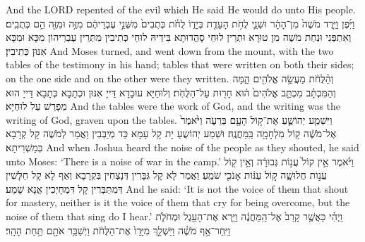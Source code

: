 {{And the LORD repented of the evil which He said He would do unto His people.}{}
{וַיִּ֜פֶן וַיֵּ֤רֶד מֹשֶׁה֙ מִן־הָהָ֔ר וּשְׁנֵ֛י לֻחֹ֥ת הָעֵדֻ֖ת בְּיָד֑וֹ לֻחֹ֗ת כְּתֻבִים֙ מִשְּׁנֵ֣י עֶבְרֵיהֶ֔ם מִזֶּ֥ה וּמִזֶּ֖ה הֵ֥ם כְּתֻבִֽים׃
}
{וְאִתְפְּנִי וּנְחַת מֹשֶׁה מִן טוּרָא וּתְרֵין לוּחֵי סָהֲדוּתָא בִּידֵיהּ לוּחֵי כְּתִיבִין מִתְּרֵין עֶבְרֵיהוֹן מִכָּא וּמִכָּא אִנּוּן כְּתִיבִין׃}
{And Moses turned, and went down from the mount, with the two tables of the testimony in his hand; tables that were written on both their sides; on the one side and on the other were they written.}{}
{וְהַ֨לֻּחֹ֔ת מַעֲשֵׂ֥ה אֱלֹהִ֖ים הֵ֑מָּה וְהַמִּכְתָּ֗ב מִכְתַּ֤ב אֱלֹהִים֙ ה֔וּא חָר֖וּת עַל־הַלֻּחֹֽת׃
}
{וְלוּחַיָּא עוּבָדָא דַּייָ אִנּוּן וּכְתָבָא כְּתָבָא דַּייָ הוּא מְפָרַשׁ עַל לוּחַיָּא׃}
{And the tables were the work of God, and the writing was the writing of God, graven upon the tables.}{}
{וַיִּשְׁמַ֧ע יְהוֹשֻׁ֛עַ אֶת־ק֥וֹל הָעָ֖ם בְּרֵעֹ֑ה וַיֹּ֙אמֶר֙ אֶל־מֹשֶׁ֔ה ק֥וֹל מִלְחָמָ֖ה בַּֽמַּחֲנֶֽה׃
}
{וּשְׁמַע יְהוֹשֻעַ יָת קָל עַמָּא כַּד מְיַבְּבִין וַאֲמַר לְמֹשֶׁה קָל קְרָבָא בְּמַשְׁרִיתָא׃}
{And when Joshua heard the noise of the people as they shouted, he said unto Moses: ‘There is a noise of war in the camp.’}{}
{וַיֹּ֗אמֶר אֵ֥ין קוֹל֙ עֲנ֣וֹת גְּבוּרָ֔ה וְאֵ֥ין ק֖וֹל עֲנ֣וֹת חֲלוּשָׁ֑ה ק֣וֹל עַנּ֔וֹת אָנֹכִ֖י שֹׁמֵֽעַ׃
}
{וַאֲמַר לָא קָל גִּבָּרִין דְּנָצְחִין בִּקְרָבָא וְאַף לָא קָל חַלָּשִׁין דְּמִתַּבְּרִין קָל דִּמְחָיְכִין אֲנָא שָׁמַע׃}
{And he said: ‘It is not the voice of them that shout for mastery, neither is it the voice of them that cry for being overcome, but the noise of them that sing do I hear.’}{}
{וַֽיְהִ֗י כַּאֲשֶׁ֤ר קָרַב֙ אֶל־הַֽמַּחֲנֶ֔ה וַיַּ֥רְא אֶת־הָעֵ֖גֶל וּמְחֹלֹ֑ת וַיִּֽחַר־אַ֣ף מֹשֶׁ֗ה וַיַּשְׁלֵ֤ךְ מִיָּדָו֙ אֶת־הַלֻּחֹ֔ת וַיְשַׁבֵּ֥ר אֹתָ֖ם תַּ֥חַת הָהָֽר׃
}}
